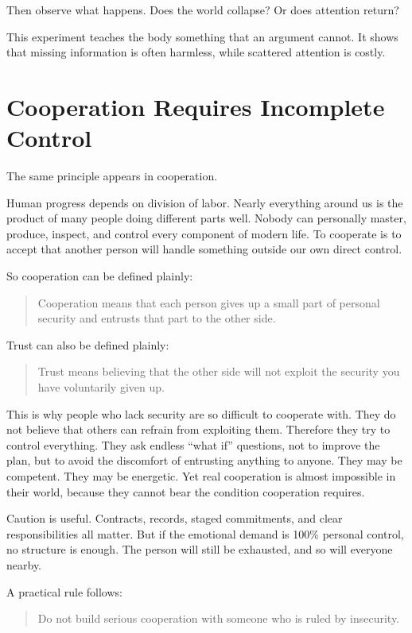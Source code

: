 Then observe what happens. Does the world collapse? Or does attention return?

This experiment teaches the body something that an argument cannot. It shows that missing information is often harmless, while scattered attention is costly.

\section*{Cooperation Requires Incomplete Control}

The same principle appears in cooperation.

Human progress depends on division of labor. Nearly everything around us is the product of many people doing different parts well. Nobody can personally master, produce, inspect, and control every component of modern life. To cooperate is to accept that another person will handle something outside our own direct control.

So cooperation can be defined plainly:

\begin{quote}
Cooperation means that each person gives up a small part of personal security and entrusts that part to the other side.
\end{quote}

Trust can also be defined plainly:

\begin{quote}
Trust means believing that the other side will not exploit the security you have voluntarily given up.
\end{quote}

This is why people who lack security are so difficult to cooperate with. They do not believe that others can refrain from exploiting them. Therefore they try to control everything. They ask endless ``what if'' questions, not to improve the plan, but to avoid the discomfort of entrusting anything to anyone. They may be competent. They may be energetic. Yet real cooperation is almost impossible in their world, because they cannot bear the condition cooperation requires.

Caution is useful. Contracts, records, staged commitments, and clear responsibilities all matter. But if the emotional demand is 100\% personal control, no structure is enough. The person will still be exhausted, and so will everyone nearby.

A practical rule follows:

\begin{quote}
Do not build serious cooperation with someone who is ruled by insecurity.
\end{quote}

